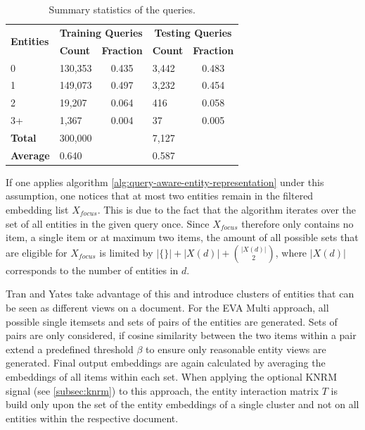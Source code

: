 \begin{table}[!htb]
    \centering
    \small
    \begin{tabular}{lp{2cm}cp{2cm}c}
    \hline
    \multirow{2}{*}{\textbf{Entities}} & \multicolumn{2}{c}{\textbf{Training Queries}} & \multicolumn{2}{c}{\textbf{Testing Queries}} \\
                                 & \textbf{Count}           & \textbf{Fraction}          & \textbf{Count}           & \textbf{Fraction}          \\
    \hline
    0 & 130,353 & 0.435 & 3,442 & 0.483 \\
    1 & 149,073 & 0.497 & 3,232 & 0.454 \\
    2 & 19,207 & 0.064 & 416 & 0.058 \\
    3+ & 1,367 & 0.004 & 37 & 0.005 \\
    \hline
    \textbf{Total} & 300,000 &  & 7,127 &  \\
    \textbf{Average} & 0.640 &  & 0.587 &  \\
    \hline
    \end{tabular}
    \caption{Summary statistics of the queries.}
    \label{tab:query_statistics}
\end{table}

If one applies algorithm \ref{alg:query-aware-entity-representation} under this assumption, one notices that at most two entities remain in the filtered embedding list $X_{focus}$. This is due to the fact that the algorithm iterates over the set of all entities in the given query once. Since $X_{focus}$ therefore only contains no item, a single item or at maximum two items, the amount of all possible sets that are eligible for $X_{focus}$ is limited by $|\{\}| + |X(d)| + \binom{|X(d)|}{2}$, where $|X(d)|$ corresponds to the number of entities in $d$. 

Tran and Yates take advantage of this and introduce clusters of entities that can be seen as different views on a document. For the EVA Multi approach, all possible single itemsets and sets of pairs of the entities are generated. Sets of pairs are only considered, if cosine similarity between the two items within a pair extend a predefined threshold $\beta$ to ensure only reasonable entity views are generated. Final output embeddings are again calculated by averaging the embeddings of all items within each set. When applying the optional KNRM signal (see \autoref{subsec:knrm}) to this approach, the entity interaction matrix $T$ is build only upon the set of the entity embeddings of a single cluster and not on all entities within the respective document.

